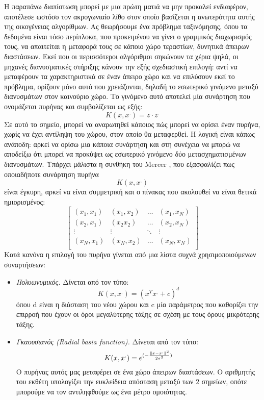 		Η παραπάνω διαπίστωση μπορεί με μια πρώτη ματιά να μην προκαλεί ενδιαφέρον, αποτέλεσε ωστόσο τον ακρογωνιαίο λίθο στον οποίο βασίζεται η ανωτερότητα αυτής της οικογένειας αλγορίθμων. Ας θεωρήσουμε ένα πρόβλημα ταξινόμησης, όπου τα δεδομένα είναι τόσο περίπλοκα, που προκειμένου να γίνει ο γραμμικός διαχωρισμός τους, να απαιτείται η μεταφορά τους σε κάποιο χώρο τεραστίων, δυνητικά άπειρων διαστάσεων. Εκεί που οι περισσότεροι αλγόριθμοι σηκώνουν τα χέρια ψηλά, οι μηχανές διανυσματικές στήριξης κάνουν την εξής σχεδιαστική επιλογή: αντί να μεταφέρουν τα χαρακτηριστικά σε έναν άπειρο χώρο και να επιλύσουν εκεί το πρόβλημα, ορίζουν μόνο αυτό που χρειάζονται, δηλαδή το εσωτερικό γινόμενο μεταξύ διανυσμάτων στον καινούριο χώρο. Το γινόμενο αυτό αποτελεί μία συνάρτηση που ονομάζεται πυρήνας και συμβολίζεται ως εξής: 
		\begin{equation}
		K(x, x^,)= z \cdot z^,
		\end{equation}
		Σε αυτό το σημείο, μπορεί να αναρωτηθεί κάποιος πώς μπορεί να ορίσει έναν πυρήνα, χωρίς να έχει αντίληψη του χώρου, στον οποίο θα μεταφερθεί. Η λογική είναι κάπως ανάποδη: αρκεί να ορίσω μια κάποια συνάρτηση και στη συνέχεια να μπορώ να αποδείξω ότι μπορεί να προκύψει ως εσωτερικό γινόμενο δύο μετασχηματισμένων διανυσμάτων. Υπάρχει μάλιστα η συνθήκη του Mercer \citet{Mercer415}, που εξασφαλίζει πως οποιαδήποτε συνάρτηση πυρήνα
		\begin{equation}
		K(x, x^,)
		\end{equation}
		είναι έγκυρη, αρκεί να είναι συμμετρική και ο πίνακας που ακολουθεί να είναι θετικά ημιορισμένος:
		\begin{equation}
		\begin{bmatrix}
		(x_1, x_1) &  (x_1, x_2)  & \dots  &   (x_1, x_N) \\
		(x_2, x_1) &  (x_2 x_2)  & \dots  &   (x_2, x_N) \\
		\vdots  & \vdots &\ddots & \vdots \\
		(x_N, x_1) &  (x_N, x_2)  & \dots  &   (x_N, x_N) \\
		\end{bmatrix}
		\end{equation}
		Κατά κανόνα η επιλογή του πυρήνα γίνεται από μια λίστα συχνά χρησιμοποιούμενων συναρτήσεων:
		\begin{itemize}
			\item \textit{Πολυωνυμικός.} Δίνεται από τον τύπο:
			\begin{equation}
			K(x, x^,)= (x^T x^, + c)^d
			\end{equation}
			όπου d είναι η διάσταση του νέου χώρου και c μία παράμετρος που καθορίζει την επιρροή που έχουν οι όροι μεγαλύτερης τάξης σε σχέση με τους όρους μικρότερης τάξης.
			\item \textit{Γκαουσιανός (Radial basia function).} Δίνεται από τον τύπο:
		\begin{equation}
		K(x, x^,)= e^{(-\frac{\left\lVert x-x^,\right\rVert^2}{2 \sigma ^2})}
		\end{equation}
			Ο πυρήνας αυτός μας μεταφέρει σε ένα χώρο άπειρων διαστάσεων. Ο αριθμητής του εκθέτη υπολογίζει την ευκλείδεια απόσταση μεταξύ των 2 σημείων, οπότε μπορούμε να τον αντιληφθούμε ως ένα μέτρο ομοιότητας.
		\end{itemize}
